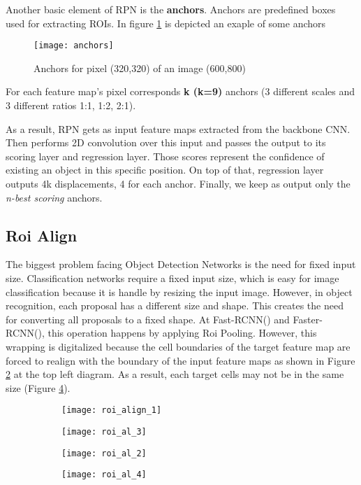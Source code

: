 Another basic element of RPN is the \textbf{anchors}. Anchors are predefined boxes used for extracting ROIs. In figure \ref{fig:anchors} is
depicted an exaple of some anchors
\begin{figure}[h]
  \centering
  \texttt{[image: anchors]}
  \caption{ Anchors for pixel (320,320) of an image (600,800) }
  \label{fig:anchors}
\end{figure}

For each feature map's pixel corresponds \textbf{k (k=9)} anchors (3 different scales and 3 different ratios 1:1, 1:2, 2:1). \par
As a result, RPN gets as input feature maps extracted from the backbone CNN. Then performs 2D convolution over this input and passes
the output to its scoring layer and regression layer. Those scores represent the confidence of existing an object in this specific position.
On top of that, regression layer outputs 4k displacements, 4 for each anchor. Finally, we keep as output only the \textit{ n-best scoring} anchors.

\subsection{Roi Align}

The biggest problem facing Object Detection Networks is the need for fixed input size. Classification networks require a fixed input size, which
is easy for image classification because it is handle by resizing the input image. However, in object recognition, each proposal has a different size
and shape. This creates the need for converting all proposals to a fixed shape. At Fast-RCNN(\cite{Girshick:2015:FR:2919332.2920125}) and
Faster-RCNN(\cite{Ren:2015:FRT:2969239.2969250}), this operation happens by applying Roi Pooling. However, this wrapping is digitalized because
the cell boundaries of the target feature map are forced to realign with the boundary of the input feature maps as shown in Figure \ref{fig:roi_pooling_align_1}
at the top left diagram. As a result, each target cells may not be in the same size (Figure \ref{fig:roi_pooling_align_2}).

\begin {figure}[h]
  \centering
  \begin{subfigure}{0.35\textwidth}
    \texttt{[image: roi\_align\_1]}
    \caption{}
    \label{fig:roi_pooling_align_1}
  \end{subfigure}
  \hfill
    \begin{subfigure}{0.35\textwidth}
    \texttt{[image: roi\_al\_3]}
    \caption{}
    \label{fig:roi_pooling_align_3}
  \end{subfigure}
  \hfill
    \begin{subfigure}{0.35\textwidth}
    \texttt{[image: roi\_al\_2]}
    \caption{}
    \label{fig:roi_pooling_align_2}
  \end{subfigure}
  \hfill
    \begin{subfigure}{0.35\textwidth}
    \texttt{[image: roi\_al\_4]}
    \caption{}
    \label{fig:roi_pooling_align_4}
  \end{subfigure}
  \caption{}
  \label{fig:roi_pooling_align}
\end{figure}

